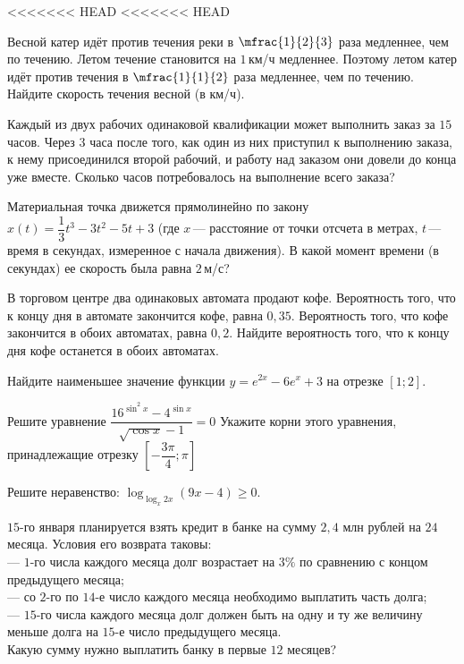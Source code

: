 \begin{class}[number=4]
	\begin{listofex}
<<<<<<< HEAD
<<<<<<< HEAD
		\item Весной катер идёт против течения реки в \(\mfrac{1 }{2 }{ 3}\) раза медленнее, чем по течению. Летом течение становится на \(1\) км/ч медленнее. Поэтому летом катер идёт против течения в \(\mfrac{1 }{1 }{2 }\) раза медленнее, чем по течению. Найдите скорость течения весной (в км/ч).
		\item Каждый из двух рабочих одинаковой квалификации может выполнить заказ за \(15\) часов. Через \(3\) часа после того, как один из них приступил к выполнению заказа, к нему присоединился второй рабочий, и работу над заказом они довели до конца уже вместе. Сколько часов потребовалось на выполнение всего заказа?
		\item Материальная точка движется прямолинейно по закону \(x(t)=\dfrac{ 1 }{ 3 }t^3-3t^2-5t+3\) (где \(x\) --- расстояние от точки отсчета в метрах, \(t\) --- время в секундах, измеренное с начала движения). В какой момент времени (в секундах) ее скорость была равна \(2\) м/с?
		\item В торговом центре два одинаковых автомата продают кофе. Вероятность того, что к концу дня в автомате закончится кофе, равна \(0,35\). Вероятность того, что кофе закончится в обоих автоматах, равна \(0,2\). Найдите вероятность того, что к концу дня кофе останется в обоих автоматах.
		\item Найдите наименьшее значение функции \(y=e^{2x}-6e^x+3\) на отрезке \([1;2]\).
		\item 
		\begin{tasks}
			\task Решите уравнение \( \dfrac{ 16^{\sin^2x}-4^{\sin x} }{ \sqrt{\cos x}-1 }=0 \)
			\task Укажите корни этого уравнения, принадлежащие отрезку \(\left[ -\dfrac{ 3\pi }{ 4 }; \pi \right] \)
		\end{tasks}
		\item Решите неравенство: \(\log_{\log_x 2x}(9x-4) \ge 0 \).
		\item \(15\)-го января планируется взять кредит в банке на сумму \(2,4\) млн рублей на \(24\) месяца. Условия его возврата таковы: \\
		--- \(1\)-го числа каждого месяца долг возрастает на \(3\%\) по сравнению с концом предыдущего месяца; \\
		--- со \(2\)-го по \(14\)-е число каждого месяца необходимо выплатить часть долга; \\
		--- \(15\)-го числа каждого месяца долг должен быть на одну и ту же величину меньше долга на \(15\)-е число предыдущего месяца. \\
		Какую сумму нужно выплатить банку в первые \(12\) месяцев?
		

\end{listofex}
\end{class}
